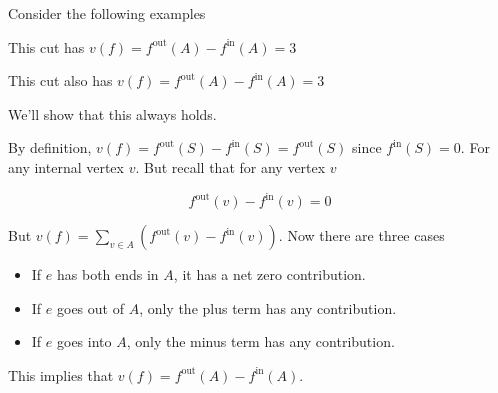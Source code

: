 \documentclass[12pt]{article}
\begin{document}
  Consider the following examples

  \begin{center}

    This cut has $v(f) = f^\text{out}(A) - f^\text{in}(A) = 3$
  \end{center}

  \vspace{0.5in}

  \begin{center}

    This cut also has $v(f) = f^\text{out}(A) - f^\text{in}(A) = 3$
  \end{center}

  We'll show that this always holds.

  {
    By definition, $v(f) =  f^\text{out}(S) - f^\text{in}(S) = f^\text{out}(S)$
    since $f^\text{in}(S) = 0$. For any internal vertex $v$. But recall that for
    any vertex $v$

    \[
      f^\text{out}(v) - f^\text{in}(v) = 0
    \]

    But $v(f) = \sum_{v \in A} (f^\text{out}(v) - f^\text{in}(v))$. Now there
    are three cases

    \begin{itemize}
      \item If $e$ has both ends in $A$, it has a net zero contribution.
      \item If $e$ goes out of $A$, only the plus term has any contribution.
      \item If $e$ goes into $A$, only the minus term has any contribution.
    \end{itemize}

    This implies that $v(f) = f^\text{out}(A) - f^\text{in}(A)$.
  }
\end{document}
